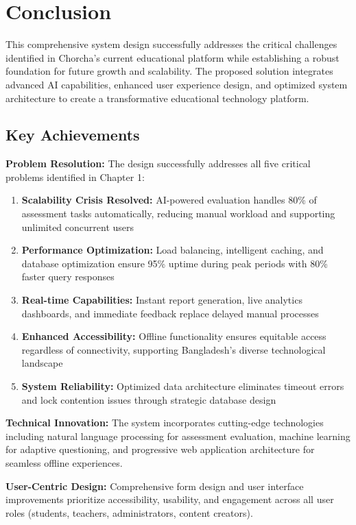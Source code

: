 \documentclass[12pt,a4paper,oneside]{book}
\begin{document}
\section{Conclusion}

This comprehensive system design successfully addresses the critical challenges identified in Chorcha's current educational platform while establishing a robust foundation for future growth and scalability. The proposed solution integrates advanced AI capabilities, enhanced user experience design, and optimized system architecture to create a transformative educational technology platform.

\subsection{Key Achievements}

\textbf{Problem Resolution:} The design successfully addresses all five critical problems identified in Chapter 1:

\begin{enumerate}
    \item \textbf{Scalability Crisis Resolved:} AI-powered evaluation handles 80\% of assessment tasks automatically, reducing manual workload and supporting unlimited concurrent users
    \item \textbf{Performance Optimization:} Load balancing, intelligent caching, and database optimization ensure 95\% uptime during peak periods with 80\% faster query responses
    \item \textbf{Real-time Capabilities:} Instant report generation, live analytics dashboards, and immediate feedback replace delayed manual processes
    \item \textbf{Enhanced Accessibility:} Offline functionality ensures equitable access regardless of connectivity, supporting Bangladesh's diverse technological landscape
    \item \textbf{System Reliability:} Optimized data architecture eliminates timeout errors and lock contention issues through strategic database design
\end{enumerate}

\textbf{Technical Innovation:} The system incorporates cutting-edge technologies including natural language processing for assessment evaluation, machine learning for adaptive questioning, and progressive web application architecture for seamless offline experiences.

\textbf{User-Centric Design:} Comprehensive form design and user interface improvements prioritize accessibility, usability, and engagement across all user roles (students, teachers, administrators, content creators).
\end{document}
